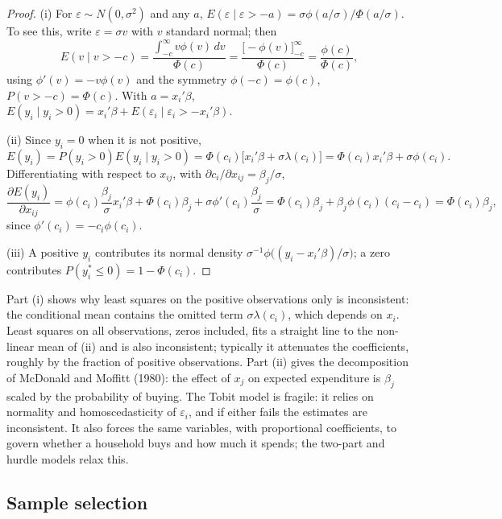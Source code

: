 \documentclass[11pt,a4paper]{article}
\numberwithin{equation}{section}
\theoremstyle{definition}
\begin{document}
\begin{proof}
(i) For $\varepsilon \sim N(0, \sigma^2)$ and any $a$, $E(\varepsilon \mid \varepsilon > -a) = \sigma\phi(a/\sigma)/\Phi(a/\sigma)$. To see this, write $\varepsilon = \sigma v$ with $v$ standard normal; then
\[
E(v \mid v > -c) = \frac{\int_{-c}^\infty v\phi(v)\,dv}{\Phi(c)} = \frac{\bigl[-\phi(v)\bigr]_{-c}^\infty}{\Phi(c)} = \frac{\phi(c)}{\Phi(c)} ,
\]
using $\phi'(v) = -v\phi(v)$ and the symmetry $\phi(-c) = \phi(c)$, $P(v > -c) = \Phi(c)$. With $a = x_i'\beta$,
$E(y_i \mid y_i > 0) = x_i'\beta + E(\varepsilon_i \mid \varepsilon_i > -x_i'\beta)$.

(ii) Since $y_i = 0$ when it is not positive,
\[
E(y_i) = P(y_i > 0)E(y_i \mid y_i > 0) = \Phi(c_i)\bigl[x_i'\beta + \sigma\lambda(c_i)\bigr] = \Phi(c_i)x_i'\beta + \sigma\phi(c_i) .
\]
Differentiating with respect to $x_{ij}$, with $\partial c_i/\partial x_{ij} = \beta_j/\sigma$,
\[
\frac{\partial E(y_i)}{\partial x_{ij}} = \phi(c_i)\frac{\beta_j}{\sigma}x_i'\beta + \Phi(c_i)\beta_j + \sigma\phi'(c_i)\frac{\beta_j}{\sigma} = \Phi(c_i)\beta_j + \beta_j\phi(c_i)(c_i - c_i) = \Phi(c_i)\beta_j ,
\]
since $\phi'(c_i) = -c_i\phi(c_i)$.

(iii) A positive $y_i$ contributes its normal density $\sigma^{-1}\phi\bigl((y_i - x_i'\beta)/\sigma\bigr)$; a zero contributes $P(y_i^* \leq 0) = 1 - \Phi(c_i)$.
\end{proof}

Part (i) shows why least squares on the positive observations only is inconsistent: the conditional mean contains the omitted term $\sigma\lambda(c_i)$, which
depends on $x_i$. Least squares on all observations, zeros included, fits a straight line to the non-linear mean of (ii) and is also inconsistent;
typically it attenuates the coefficients, roughly by the fraction of positive observations. Part (ii) gives the decomposition of McDonald and Moffitt
(1980): the effect of $x_j$ on expected expenditure is $\beta_j$ scaled by the probability of buying. The Tobit model is fragile: it relies on normality and
homoscedasticity of $\varepsilon_i$, and if either fails the estimates are inconsistent. It also forces the same variables, with proportional coefficients, to govern
whether a household buys and how much it spends; the two-part and hurdle models relax this.

\subsection{Sample selection}
\label{ssec:heckman}
\end{document}

